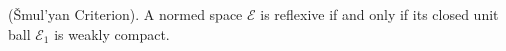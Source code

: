 (Šmul’yan Criterion). A normed space $\mathcal{E}$ is reflexive if and only if its closed unit ball $\mathcal{E}_1$ is weakly compact.
